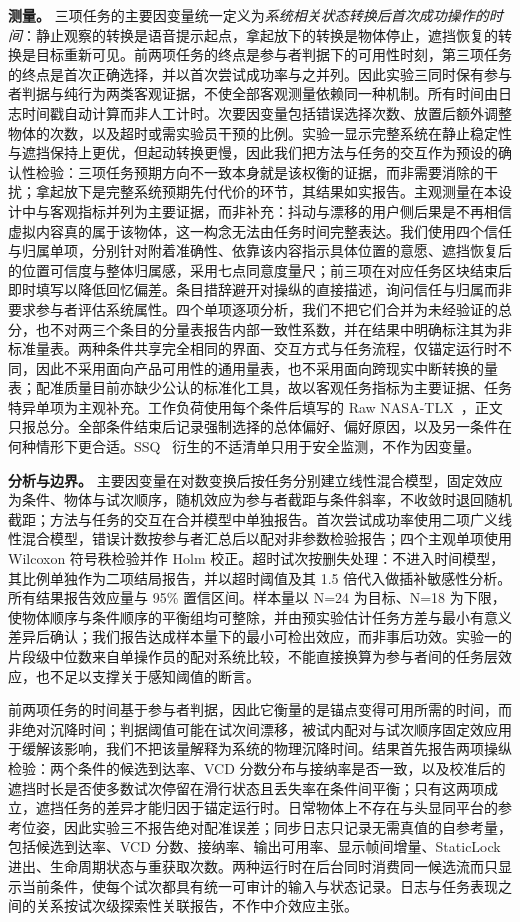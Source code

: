 \documentclass[review]{vgtc}
\begin{document}
\textbf{测量。} 三项任务的主要因变量统一定义为\emph{系统相关状态转换后首次成功操作的时间}：静止观察的转换是语音提示起点，拿起放下的转换是物体停止，遮挡恢复的转换是目标重新可见。前两项任务的终点是参与者判据下的可用性时刻，第三项任务的终点是首次正确选择，并以首次尝试成功率与之并列。因此实验三同时保有参与者判据与纯行为两类客观证据，不使全部客观测量依赖同一种机制。所有时间由日志时间戳自动计算而非人工计时。次要因变量包括错误选择次数、放置后额外调整物体的次数，以及超时或需实验员干预的比例。实验一显示完整系统在静止稳定性与遮挡保持上更优，但起动转换更慢，因此我们把方法与任务的交互作为预设的确认性检验：三项任务预期方向不一致本身就是该权衡的证据，而非需要消除的干扰；拿起放下是完整系统预期先付代价的环节，其结果如实报告。主观测量在本设计中与客观指标并列为主要证据，而非补充：抖动与漂移的用户侧后果是不再相信虚拟内容真的属于该物体，这一构念无法由任务时间完整表达。我们使用四个信任与归属单项，分别针对附着准确性、依靠该内容指示具体位置的意愿、遮挡恢复后的位置可信度与整体归属感，采用七点同意度量尺；前三项在对应任务区块结束后即时填写以降低回忆偏差。条目措辞避开对操纵的直接描述，询问信任与归属而非要求参与者评估系统属性。四个单项逐项分析，我们不把它们合并为未经验证的总分，也不对两三个条目的分量表报告内部一致性系数，并在结果中明确标注其为非标准量表。两种条件共享完全相同的界面、交互方式与任务流程，仅锚定运行时不同，因此不采用面向产品可用性的通用量表，也不采用面向跨现实中断转换的量表；配准质量目前亦缺少公认的标准化工具，故以客观任务指标为主要证据、任务特异单项为主观补充。工作负荷使用每个条件后填写的 Raw NASA-TLX~\cite{hart1988nasatlx}，正文只报总分。全部条件结束后记录强制选择的总体偏好、偏好原因，以及另一条件在何种情形下更合适。SSQ~\cite{kennedy1993ssq} 衍生的不适清单只用于安全监测，不作为因变量。

\textbf{分析与边界。} 主要因变量在对数变换后按任务分别建立线性混合模型，固定效应为条件、物体与试次顺序，随机效应为参与者截距与条件斜率，不收敛时退回随机截距；方法与任务的交互在合并模型中单独报告。首次尝试成功率使用二项广义线性混合模型，错误计数按参与者汇总后以配对非参数检验报告；四个主观单项使用 Wilcoxon 符号秩检验并作 Holm 校正。超时试次按删失处理：不进入时间模型，其比例单独作为二项结局报告，并以超时阈值及其 1.5 倍代入做插补敏感性分析。所有结果报告效应量与 95\% 置信区间。样本量以 N=24 为目标、N=18 为下限，使物体顺序与条件顺序的平衡组均可整除，并由预实验估计任务方差与最小有意义差异后确认；我们报告达成样本量下的最小可检出效应，而非事后功效。实验一的片段级中位数来自单操作员的配对系统比较，不能直接换算为参与者间的任务层效应，也不足以支撑关于感知阈值的断言。

前两项任务的时间基于参与者判据，因此它衡量的是锚点变得可用所需的时间，而非绝对沉降时间；判据阈值可能在试次间漂移，被试内配对与试次顺序固定效应用于缓解该影响，我们不把该量解释为系统的物理沉降时间。结果首先报告两项操纵检验：两个条件的候选到达率、VCD 分数分布与接纳率是否一致，以及校准后的遮挡时长是否使多数试次停留在滑行状态且丢失率在条件间平衡；只有这两项成立，遮挡任务的差异才能归因于锚定运行时。日常物体上不存在与头显同平台的参考位姿，因此实验三不报告绝对配准误差；同步日志只记录无需真值的自参考量，包括候选到达率、VCD 分数、接纳率、输出可用率、显示帧间增量、StaticLock 进出、生命周期状态与重获取次数。两种运行时在后台同时消费同一候选流而只显示当前条件，使每个试次都具有统一可审计的输入与状态记录。日志与任务表现之间的关系按试次级探索性关联报告，不作中介效应主张。
\end{document}
